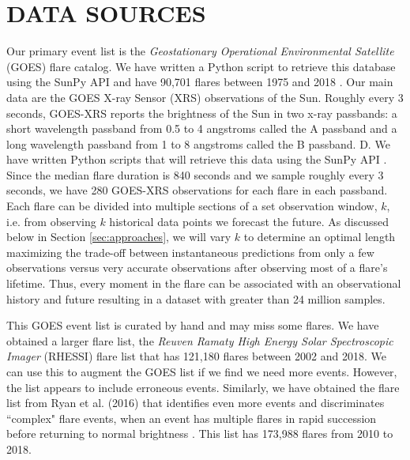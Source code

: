 \documentclass[letterpaper, 10 pt, onecolumn]{ieeeconf}
\begin{document}
\section{DATA SOURCES}
Our primary event list is the \textit{Geostationary Operational Environmental Satellite} (GOES) flare catalog. We have written a Python script to retrieve this database using the SunPy API and have 90,701 flares between 1975 and 2018 \cite{sunpy}. Our main data are the GOES X-ray Sensor (XRS) observations of the Sun. Roughly every 3 seconds, GOES-XRS reports the brightness of the Sun in two x-ray passbands: a short wavelength passband from 0.5 to 4 angstroms called the A passband and a long wavelength passband from 1 to 8 angstroms called the B passband. D. We have written Python scripts that will retrieve this data using the SunPy API \cite{sunpy}. Since the median flare duration is 840 seconds and we sample roughly every 3 seconds, we have 280 GOES-XRS observations for each flare in each passband. Each flare can be divided into multiple sections of a set observation window, $k$, i.e. from observing $k$ historical data points we forecast the future. As discussed below in Section \ref{sec:approaches}, we will vary $k$ to determine an optimal length maximizing the trade-off between instantaneous predictions from only a few observations versus very accurate observations after observing most of a flare's lifetime. Thus, every moment in the flare can be associated with an observational history and future resulting in a dataset with greater than 24 million samples. 

This GOES event list is curated by hand and may miss some flares. We have obtained a larger flare list, the \textit{Reuven Ramaty High Energy Solar Spectroscopic Imager} (RHESSI) flare list that has 121,180 flares between 2002 and 2018. We can use this to augment the GOES list if we find we need more events. However, the list appears to include erroneous events. Similarly, we have obtained the flare list from Ryan et al. (2016) that identifies even more events and discriminates ``complex" flare events, when an event has multiple flares in rapid succession before returning to normal brightness \cite{ryan}. This list has 173,988 flares from 2010 to 2018. 
\end{document}
